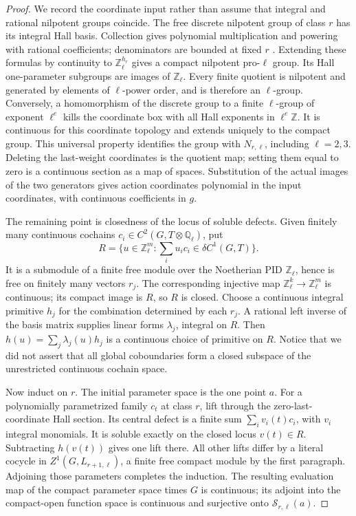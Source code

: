 \begin{proof}
We record the coordinate input rather than assume that integral and
rational nilpotent groups coincide. The free discrete nilpotent group of
class $r$ has its integral Hall basis. Collection gives polynomial
multiplication and powering with rational coefficients; denominators are
bounded at fixed $r$ \cite[\S\S3--4]{CohCantEick2019}. Extending these
formulas by continuity to $\mathbb Z_\ell^{h_r}$ gives a compact
nilpotent pro-$\ell$ group. Its Hall one-parameter subgroups are images
of $\mathbb Z_\ell$. Every finite quotient is nilpotent and generated
by elements of $\ell$-power order, and is therefore an $\ell$-group.
Conversely, a homomorphism of the discrete group to a finite $\ell$-group
of exponent $\ell^e$ kills the coordinate box with all Hall exponents
in $\ell^e\mathbb Z$. It is continuous for this coordinate topology
and extends uniquely to the compact group. This universal property
identifies the group with $N_{r,\ell}$, including $\ell=2,3$.
Deleting the last-weight coordinates is the quotient map; setting them
equal to zero is a continuous section as a map of spaces. Substitution
of the actual images of the two generators gives action coordinates
polynomial in the input coordinates, with continuous coefficients in $g$.

The remaining point is closedness of the locus of soluble defects.
Given finitely many continuous cochains
$c_i\in C^2(G,T\otimes\mathbb Q_\ell)$, put
\[
 R=\{u\in\mathbb Z_\ell^m:\textstyle\sum_i u_ic_i
                    \in\delta C^1(G,T)\}.
\]
It is a submodule of a finite free module over the Noetherian PID
$\mathbb Z_\ell$, hence is free on finitely many vectors $r_j$.
The corresponding injective map $\mathbb Z_\ell^k\to
\mathbb Z_\ell^m$ is continuous; its compact image is $R$, so $R$
is closed. Choose a continuous integral primitive $h_j$ for the
combination determined by each $r_j$. A rational left inverse of the
basis matrix supplies linear forms $\lambda_j$, integral on $R$.
Then $h(u)=\sum_j\lambda_j(u)h_j$ is a continuous choice of primitive
on $R$. Notice that we did not assert that all global coboundaries form
a closed subspace of the unrestricted continuous cochain space.

Now induct on $r$. The initial parameter space is the one point $a$.
For a polynomially parametrized family $c_t$ at class $r$, lift through
the zero-last-coordinate Hall section. Its central defect is a finite
sum $\sum_i v_i(t)c_i$, with $v_i$ integral monomials. It is soluble
exactly on the closed locus $v(t)\in R$. Subtracting $h(v(t))$ gives
one lift there. All other lifts differ by a literal cocycle in
$Z^1(G,L_{r+1,\ell})$, a finite free compact module by the first
paragraph. Adjoining those parameters completes the induction. The
resulting evaluation map of the compact parameter space times $G$ is
continuous; its adjoint into the compact-open function space is
continuous and surjective onto $\mathscr S_{r,\ell}(a)$.
\end{proof}

